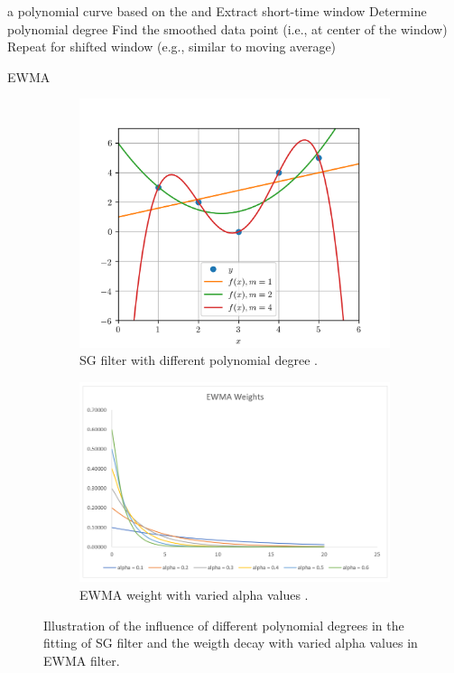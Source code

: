 a polynomial curve based on the  and  Extract short-time window 
Determine polynomial degree
Find the smoothed data point (i.e., at center of the window)
Repeat for shifted window (e.g., similar to moving average)

EWMA

\begin{figure}[h]
    \centering
    \begin{subfigure}{0.4\textwidth}
      \includegraphics[width=\linewidth]{imgs/pre-processing/demo-polynomial-fitting.png}
      \caption{SG filter with different polynomial degree \citep{taalSmoothingYourData2017}.} \label{fig:filters-sg}
    \end{subfigure}%
    \hspace{3em}%
    \begin{subfigure}{0.5\textwidth}
      \includegraphics[width=\linewidth]{imgs/pre-processing/demo-weight-ewma.png}
      \caption{EWMA weight with varied alpha values \citep{cfiExponentiallyWeightedMoving2022}.} \label{fig:filters-ewma}
    \end{subfigure}%
  \caption{Illustration of the influence of different polynomial degrees in the fitting of SG filter and the weigth decay with varied alpha values in EWMA filter.} \label{fig:filters}
\end{figure}

